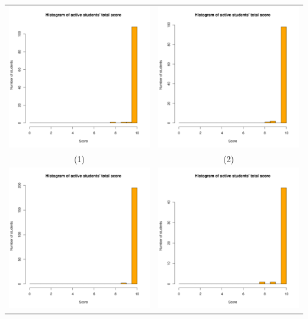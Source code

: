 \documentclass[a4paper]{article}
\theoremstyle{definition}
\begin{document}
\begin{enumerate}[a)]
\begin{itemize}
\begin{center}
\begin{tabular}{c c}
                 \includegraphics[width = 6.9cm]{Images/img10-1-1.png} & \includegraphics[width = 6.9cm]{Images/img10-1-2.png} \\
                 (1) & (2) \\
                 \includegraphics[width = 6.9cm]{Images/img10-1-3.png} &
                 \includegraphics[width = 6.9cm]{Images/img10-1-4.png} \\

\end{tabular}
\end{center}
\end{itemize}
\end{enumerate}
\end{document}
